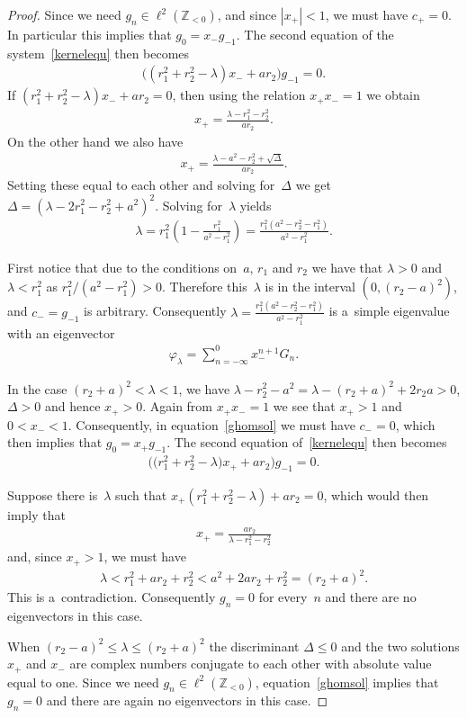 \documentclass[11pt]{article}
\numberwithin{equation}{section}
\begin{document}
\begin{proof}
Since we need $g_n\in\ell^2({\mathbb Z}_{<0})$, and since $|x_+|<1$, we must have $c_+=0$.
In particular this implies that $g_0=x_-g_{-1}$.
The second equation of the system~\eqref{kernelequ} then becomes
\begin{gather*}
\big((r_1^2+r_2^2-\lambda)x_-+ar_2\big)g_{-1} =0.
\end{gather*}
If $(r_1^2+ r_2^2-\lambda)x_-+ar_2=0$, then using the relation $x_+x_- =1$ we obtain
\begin{gather*}
x_+=\frac{\lambda-r_1^2-r_2^2}{ar_2}.
\end{gather*}
On the other hand we also have
\begin{gather*}
x_+=\frac{\lambda-a^2-r_2^2+\sqrt{\Delta}}{ar_2}.
\end{gather*}
Setting these equal to each other and solving for~$\Delta$ we get $\Delta=(\lambda-2r_1^2-r_2^2+a^2)^2$.
Solving for~$\lambda$ yields
\begin{gather*}
\lambda=r_1^2\left(1-\frac{r_1^2}{a^2- r_1^2}\right)=\frac{r_1^2(a^2-r_2^2-r_1^2)}{a^2-r_1^2}.
\end{gather*}

First notice that due to the conditions on~$a$, $r_1$ and $r_2$ we have that $\lambda>0$ and $\lambda <r_1^2$ as
$r_1^2/(a^2-r_1^2)>0$.
Therefore this~$\lambda$ is in the interval $(0,(r_2-a)^2)$, and $c_-=g_{-1}$ is arbitrary.
Consequently $\lambda =\frac{r_1^2(a^2-r_2^2-r_1^2)}{a^2-r_1^2}$ is a~simple eigenvalue with an eigenvector
\begin{gather*}
\varphi_\lambda=\sum\limits_{n=-\infty}^0x_-^{n+1}G_n.
\end{gather*}

In the case $(r_2+a)^2<\lambda<1$, we have $\lambda-r_2^2-a^2=\lambda-(r_2+a)^2+2r_2a>0$, $\Delta>0$ and hence $x_+>0$.
Again from $x_+x_-=1$ we see that $x_+>1$ and $0<x_-<1$.
Consequently, in equation~\eqref{ghomsol} we must have $c_-=0$, which then implies that $g_0=x_+g_{-1}$.
The second equation of~\eqref{kernelequ} then becomes
\begin{gather*}
\big(\big(r_1^2+r_2^2-\lambda\big)x_++ar_2\big)g_{-1} =0.
\end{gather*}

Suppose there is~$\lambda$ such that $x_+(r_1^2+ r_2^2-\lambda)+ar_2=0$, which would then imply that
\begin{gather*}
x_+=\frac{ar_2}{\lambda-r_1^2-r_2^2}
\end{gather*}
and, since $x_+>1$, we must have
\begin{gather*}
\lambda < r_1^2+ar_2+r_2^2 < a^2+2ar_2+r_2^2=(r_2+a)^2.
\end{gather*}
This is a~contradiction.
Consequently $g_{n}=0$ for every~$n$ and there are no eigenvectors in this case.

When $(r_2-a)^2\leq\lambda\leq (r_2+a)^2$ the discriminant $\Delta\leq 0$ and the two solutions $x_+$ and $x_-$ are
complex numbers conjugate to each other with absolute value equal to one.
Since we need $g_n\in\ell^2({\mathbb Z}_{<0})$, equation~\eqref{ghomsol} implies that $g_{n}=0$ and there are again no
eigenvectors in this case.
\end{proof}
\end{document}
